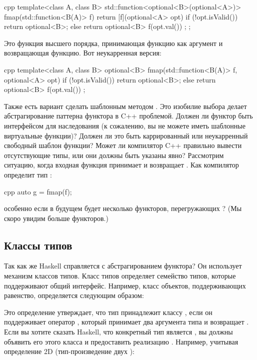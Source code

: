 \begin{snip}{cpp}
template<class A, class B>
std::function<optional<B>(optional<A>)>
fmap(std::function<B(A)> f) {
    return [f](optional<A> opt) {
        if (!opt.isValid())
            return optional<B>{};
        else
            return optional<B>{ f(opt.val()) };
    };
}
\end{snip}
Это функция высшего порядка, принимающая функцию как аргумент и возвращающая функцию. Вот неукарренная версия:

\begin{snip}{cpp}
template<class A, class B>
optional<B> fmap(std::function<B(A)> f, optional<A> opt) {
    if (!opt.isValid())
        return optional<B>{};
    else
        return optional<B>{ f(opt.val()) };
}
\end{snip}
Также есть вариант сделать  шаблонным методом . Это изобилие выбора делает абстрагирование паттерна функтора в C++ проблемой. Должен ли функтор быть интерфейсом для наследования (к сожалению, вы не можете иметь шаблонные виртуальные функции)? Должен ли это быть каррированный или неукарренный свободный шаблон функции? Может ли компилятор C++ правильно вывести отсутствующие типы, или они должны быть указаны явно? Рассмотрим ситуацию, когда входная функция  принимает  и возвращает . Как компилятор определит тип :

\begin{snip}{cpp}
auto g = fmap(f);
\end{snip}
особенно если в будущем будет несколько функторов, перегружающих ? (Мы скоро увидим больше функторов.)

\subsection{Классы типов}

Так как же Haskell справляется с абстрагированием функтора? Он использует механизм классов типов. Класс типов определяет семейство типов, которые поддерживают общий интерфейс. Например, класс объектов, поддерживающих равенство, определяется следующим образом:

Это определение утверждает, что тип  принадлежит классу , если он поддерживает оператор \code{(==)}, который принимает два аргумента типа  и возвращает . Если вы хотите сказать Haskell, что конкретный тип является , вы должны объявить его  этого класса и предоставить реализацию \code{(==)}. Например, учитывая определение 2D  (тип-произведение двух ):

